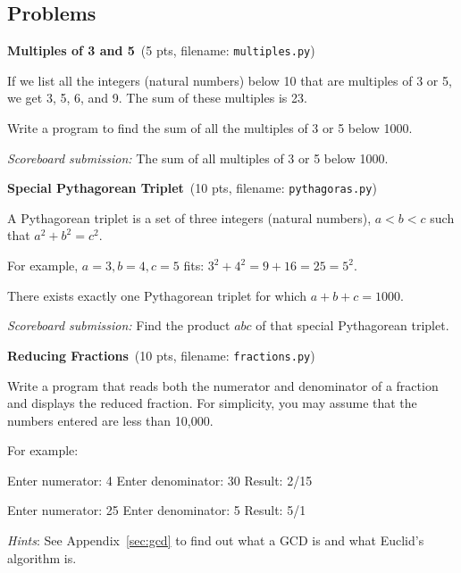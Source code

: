 \documentclass[11pt]{cselabheader}
\newcommand{\cop}[3]{\textbf{#1}~(#2 pts, filename: \texttt{#3})\quad}
\theoremstyle{plain}
\begin{document}
\pagebreak
\subsection{Problems}

\begin{enumerate}
  \item \cop{Multiples of 3 and 5}{5}{multiples.py}

    If we list all the integers (natural numbers) below 10 that are
    multiples of 3 or 5, we get 3, 5, 6, and 9. The sum of these multiples
    is 23.

    Write a program to find the sum of all the multiples of 3 or 5 below
    1000.

    \textit{Scoreboard submission:} The sum of all multiples of 3 or 5
    below 1000.

  \item \cop{Special Pythagorean Triplet}{10}{pythagoras.py}

    A Pythagorean triplet is a set of three integers (natural numbers), $a
    < b < c$ such that $a^2 + b^2 = c^2$.

    For example, $a = 3, b = 4, c = 5$ fits: $3^2 + 4^2 = 9 + 16 = 25 =
    5^2$.

    There exists exactly one Pythagorean triplet for which $a + b + c =
    1000$.

    \textit{Scoreboard submission:} Find the product $abc$ of that special
    Pythagorean triplet.

  \item \cop{Reducing Fractions}{10}{fractions.py}

    Write a program that reads both the numerator and denominator of
    a fraction and displays the reduced fraction. For simplicity, you
    may assume that the numbers entered are less than 10,000. 

    For example:

    \begin{verbatimcode}
Enter numerator: 4
Enter denominator: 30
Result: 2/15
    \end{verbatimcode}

    \begin{verbatimcode}
Enter numerator: 25
Enter denominator: 5
Result: 5/1
    \end{verbatimcode}

    \textit{Hints}: See Appendix~\ref{sec:gcd} to find out what a GCD is 
    and what Euclid's algorithm is. 


\end{enumerate}
\end{document}
